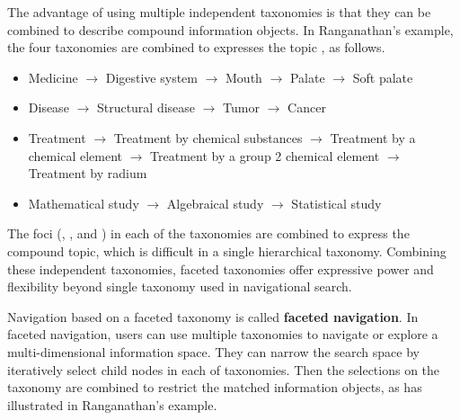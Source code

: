 The advantage of using multiple independent taxonomies is that they can be combined to describe compound information objects. In Ranganathan's example, the four taxonomies are combined to expresses the topic , as follows. 
\begin{itemize}
 \item Medicine $\rightarrow$ Digestive system $\rightarrow$ Mouth $\rightarrow$ Palate $\rightarrow$ Soft palate
\item Disease $\rightarrow$ Structural disease $\rightarrow$ Tumor $\rightarrow$ Cancer
\item Treatment $\rightarrow$ Treatment by chemical substances $\rightarrow$ Treatment by a chemical element  $\rightarrow$ Treatment by a group 2 chemical element $\rightarrow$ Treatment by radium
\item Mathematical study $\rightarrow$ Algebraical study $\rightarrow$ Statistical study
\end{itemize}
The foci (, ,  and ) in each of the taxonomies are combined to express the compound topic, which is difficult in a single hierarchical taxonomy. Combining these independent taxonomies, faceted taxonomies offer expressive power and flexibility beyond single taxonomy used in navigational search. 

Navigation based on a faceted taxonomy is called \textbf{faceted navigation}. In faceted navigation, users can use multiple taxonomies to navigate or explore a multi-dimensional information space. They can narrow the search space by iteratively select child nodes in each of taxonomies. Then the selections on the taxonomy are combined to restrict the matched information objects, as has illustrated in Ranganathan's example. 

